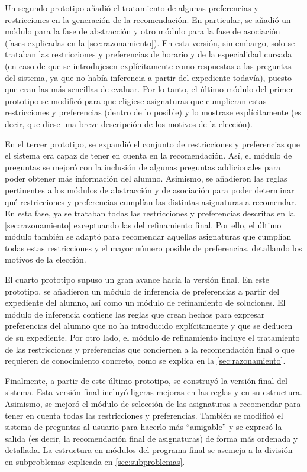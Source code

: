 Un segundo prototipo añadió el tratamiento de algunas preferencias y 
restricciones en la generación de la recomendación. En particular, se añadió 
un módulo para la fase de abstracción y otro módulo para la fase de asociación
(fases explicadas en la \autoref{sec:razonamiento}). En esta versión, sin 
embargo, solo se trataban las restricciones y preferencias de horario y de la 
especialidad cursada (en caso de que se introdujesen explícitamente como 
respuestas a las preguntas del sistema, ya que no había inferencia a partir 
del expediente todavía), puesto que eran las más sencillas de evaluar. Por lo 
tanto, el último módulo del primer prototipo se modificó para que eligiese 
asignaturas que cumplieran estas restricciones y preferencias (dentro de lo 
posible) y lo mostrase explícitamente (es decir, que diese una breve 
descripción de los motivos de la elección). 

En el tercer prototipo, se expandió el conjunto de restricciones y 
preferencias que el sistema era capaz de tener en cuenta en la recomendación. 
Así, el módulo de preguntas se mejoró con la inclusión de algunas preguntas 
addicionales para poder obtener más información del alumno. Asimismo, se 
añadieron las reglas pertinentes a los módulos de abstracción y de asociación 
para poder determinar qué restricciones y preferencias cumplían las distintas 
asignaturas a recomendar. En esta fase, ya se trataban todas las restricciones 
y preferencias descritas en la \autoref{sec:razonamiento} exceptuando las del 
refinamiento final. Por ello, el último módulo también se adaptó para 
recomendar aquellas asignaturas que cumplían todas estas restricciones y el 
mayor número posible de preferencias, detallando los motivos de la elección. 

El cuarto prototipo supuso un gran avance hacia la versión final. En este 
prototipo, se añadieron un módulo de inferencia de preferencias a partir del 
expediente del alumno, así como un módulo de refinamiento de soluciones. El 
módulo de inferencia contiene las reglas que crean hechos para expresar 
preferencias del alumno que no ha introducido explícitamente y que se deducen 
de su expediente. Por otro lado, el módulo de refinamiento incluye el 
tratamiento de las restricciones y preferencias que conciernen a la 
recomendación final o que requieren de conocimiento concreto, como se explica 
en la \autoref{sec:razonamiento}. 

Finalmente, a partir de este último prototipo, se construyó la versión final 
del sistema. Esta versión final incluyó ligeras mejoras en las reglas y en su 
estructura. Asimismo, se mejoró el módulo de selección de las asignaturas a 
recomendar para tener en cuenta todas las restricciones y preferencias. 
También se modificó el sistema de preguntas al usuario para hacerlo más 
``amigable'' y se expresó la salida (es decir, la recomendación final de 
asignaturas) de forma más ordenada y detallada. La estructura en módulos del 
programa final se asemeja a la división en subproblemas explicada en 
\autoref{sec:subproblemas}.


\clearpage

